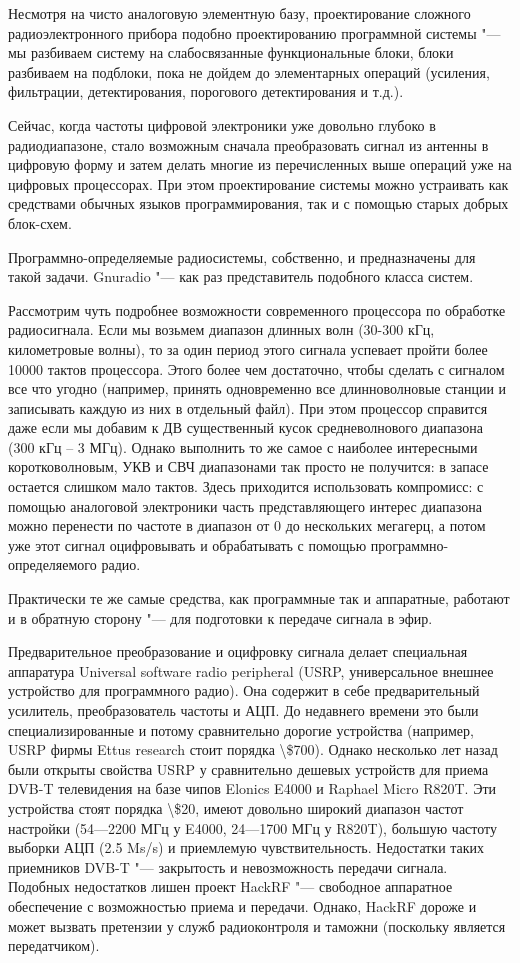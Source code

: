 \documentclass[10pt, a5paper]{article}
\begin{document}
Несмотря на чисто аналоговую элементную базу, проектирование сложного радиоэлектронного прибора подобно проектированию программной системы "--- мы разбиваем систему на слабосвязанные функциональные блоки, блоки разбиваем на подблоки, пока не дойдем до элементарных операций (усиления, фильтрации, детектирования, порогового детектирования и т.д.).

Сейчас, когда частоты цифровой электроники уже довольно глубоко в радиодиапазоне, стало возможным сначала преобразовать сигнал из антенны в цифровую форму и затем делать многие из перечисленных выше операций уже на цифровых процессорах. При этом проектирование системы можно устраивать как средствами обычных языков программирования, так и с помощью старых добрых блок-схем.

Программно-определяемые радиосистемы, собственно, и предназначены для такой задачи. Gnuradio "--- как раз представитель подобного класса систем.

Рассмотрим чуть подробнее возможности современного процессора по обработке радиосигнала. Если мы возьмем диапазон длинных волн (30-300 кГц, километровые волны), то за один период этого сигнала успевает пройти более 10000 тактов процессора. Этого более чем достаточно, чтобы сделать с сигналом все что угодно (например, принять одновременно все длинноволновые станции и записывать каждую из них в отдельный файл). При этом процессор справится даже если мы добавим к ДВ существенный кусок средневолнового диапазона (300 кГц -- 3 МГц). Однако выполнить то же самое с наиболее интересными коротковолновым, УКВ и СВЧ диапазонами так просто не получится: в запасе остается слишком мало тактов. Здесь приходится использовать компромисс: с помощью аналоговой электроники часть представляющего интерес диапазона можно перенести по частоте в диапазон от 0 до нескольких мегагерц, а потом уже этот сигнал оцифровывать и обрабатывать с помощью программно-определяемого радио.

Практически те же самые средства, как программные так и аппаратные, работают и в обратную сторону "--- для подготовки к передаче сигнала в эфир.

Предварительное преобразование и оцифровку сигнала делает специальная аппаратура Universal software radio peripheral (USRP, универсальное внешнее устройство для программного радио). Она содержит в себе предварительный усилитель, преобразователь частоты и АЦП. До недавнего времени это были специализированные и потому сравнительно дорогие устройства (например, USRP фирмы Ettus research стоит порядка \textbackslash{}\$700). Однако несколько лет назад были открыты свойства USRP у сравнительно дешевых устрой\-ств для приема DVB-T телевидения на базе чипов Elonics E4000 и \linebreak Raphael Micro R820T. Эти устройства стоят порядка \textbackslash{}\$20, имеют довольно широкий диапазон частот настройки (54---2200 МГц у E4000, 24---1700 МГц у R820T), большую частоту выборки АЦП (2.5 Ms/s) и приемлемую чувствительность. Недостатки таких приемников DVB-T "--- закрытость и невозможность передачи сигнала. Подобных недостатков лишен проект HackRF "--- свободное аппаратное обеспечение с возможностью приема и передачи. Однако, HackRF дороже и может вызвать претензии у служб радиоконтроля и таможни (поскольку является передатчиком).
\end{document}
